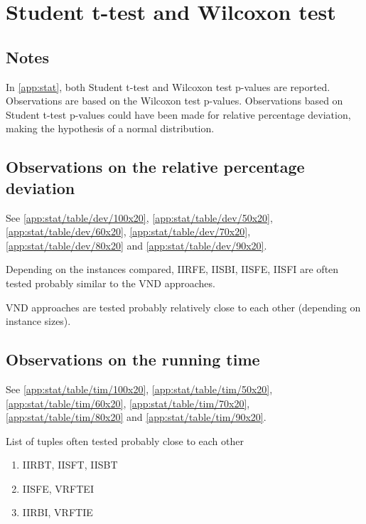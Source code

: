\newpage\cleardoublepage{}
\section{Student t-test and Wilcoxon test}

\subsection{Notes}

In \ref{app:stat}, both Student t-test and Wilcoxon test p-values are reported. Observations are based on the Wilcoxon test p-values. Observations based on Student t-test p-values could have been made for relative percentage deviation, making the hypothesis of a normal distribution.

\subsection{Observations on the relative percentage deviation}

See \ref{app:stat/table/dev/100x20}, \ref{app:stat/table/dev/50x20}, \ref{app:stat/table/dev/60x20}, \ref{app:stat/table/dev/70x20}, \ref{app:stat/table/dev/80x20} and \ref{app:stat/table/dev/90x20}.

Depending on the instances compared, IIRFE, IISBI, IISFE, IISFI are often tested probably similar to the VND approaches.

VND approaches are tested probably relatively close to each other (depending on instance sizes).

\subsection{Observations on the running time}

See \ref{app:stat/table/tim/100x20}, \ref{app:stat/table/tim/50x20}, \ref{app:stat/table/tim/60x20}, \ref{app:stat/table/tim/70x20}, \ref{app:stat/table/tim/80x20} and \ref{app:stat/table/tim/90x20}.

List of tuples often tested probably close to each other

\begin{enumerate}
	\item IIRBT, IISFT, IISBT
	\item IISFE, VRFTEI
	\item IIRBI, VRFTIE
\end{enumerate}
